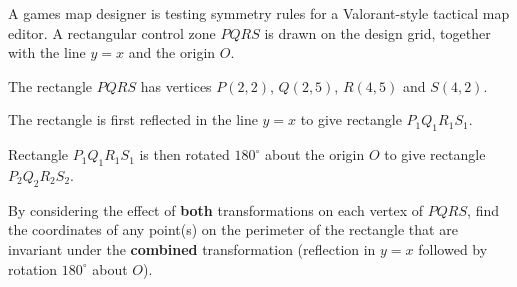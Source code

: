 \begin{question}
\noindent A games map designer is testing symmetry rules for a Valorant-style tactical map editor. A rectangular control zone $PQRS$ is drawn on the design grid, together with the line $y = x$ and the origin $O$.

\begin{center}
\end{center}

\noindent The rectangle $PQRS$ has vertices $P(2,2)$, $Q(2,5)$, $R(4,5)$ and $S(4,2)$.

\noindent The rectangle is first reflected in the line $y = x$ to give rectangle $P_1Q_1R_1S_1$.

\noindent Rectangle $P_1Q_1R_1S_1$ is then rotated $180^\circ$ about the origin $O$ to give rectangle $P_2Q_2R_2S_2$.

\noindent By considering the effect of \textbf{both} transformations on each vertex of $PQRS$, find the coordinates of any point(s) on the perimeter of the rectangle that are invariant under the \textbf{combined} transformation (reflection in $y=x$ followed by rotation $180^\circ$ about $O$).

\vspace{5cm}

\begin{flushright}
\end{flushright}
\end{question}
